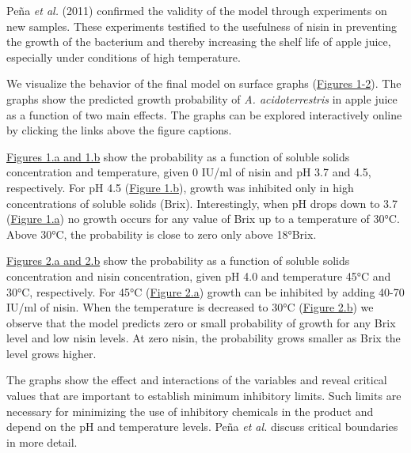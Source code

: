 \documentclass[
  12pt,
]{article}
\begin{document}
Peña \emph{et al.} (2011) confirmed the validity of the model through
experiments on new samples. These experiments testified to the
usefulness of nisin in preventing the growth of the bacterium and
thereby increasing the shelf life of apple juice, especially under
conditions of high temperature.

We visualize the behavior of the final model on surface graphs
(\hyperref[fig1a]{Figures 1-2}). The graphs show the predicted growth
probability of \emph{A. acidoterrestris} in apple juice as a function of
two main effects. The graphs can be explored interactively online by
clicking the links above the figure captions.

\hyperref[fig1a]{Figures 1.a and 1.b} show the probability as a function
of soluble solids concentration and temperature, given 0 IU/ml of nisin
and pH 3.7 and 4.5, respectively. For pH 4.5
(\hyperref[fig1b]{Figure 1.b}), growth was inhibited only in high
concentrations of soluble solids (Brix). Interestingly, when pH drops
down to 3.7 (\hyperref[fig1a]{Figure 1.a}) no growth occurs for any
value of Brix up to a temperature of 30°C. Above 30°C, the probability
is close to zero only above 18°Brix.

\hyperref[fig2a]{Figures 2.a and 2.b} show the probability as a function
of soluble solids concentration and nisin concentration, given pH 4.0
and temperature 45°C and 30°C, respectively. For 45°C
(\hyperref[fig2a]{Figure 2.a}) growth can be inhibited by adding 40-70
IU/ml of nisin. When the temperature is decreased to 30°C
(\hyperref[fig2b]{Figure 2.b}) we observe that the model predicts zero
or small probability of growth for any Brix level and low nisin levels.
At zero nisin, the probability grows smaller as Brix the level grows
higher.

The graphs show the effect and interactions of the variables and reveal
critical values that are important to establish minimum inhibitory
limits. Such limits are necessary for minimizing the use of inhibitory
chemicals in the product and depend on the pH and temperature levels.
Peña \emph{et al.} discuss critical boundaries in more detail.
\end{document}
